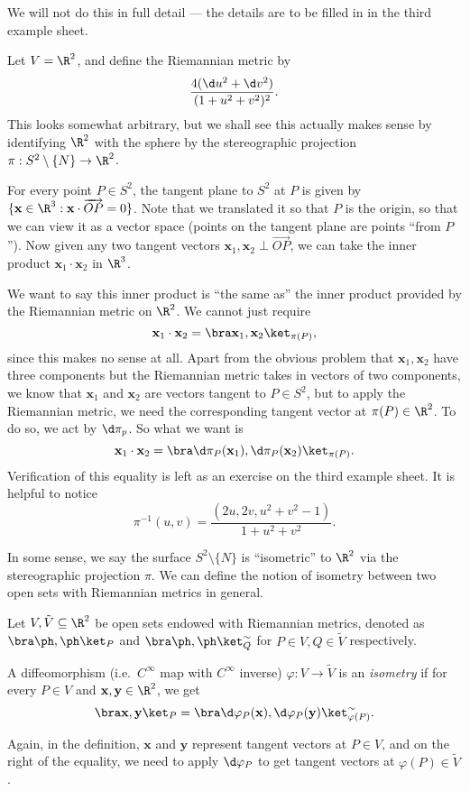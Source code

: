\documentclass[a4paper]{article}
\begin{document}
\begin{eg}
  We will not do this in full detail --- the details are to be filled in in the third example sheet.

  Let $V = \R^2$, and define the Riemannian metric by
  \[
    \frac{4(\d u^2 + \d v^2)}{(1 + u^2 + v^2)^2}.
  \]
  This looks somewhat arbitrary, but we shall see this actually makes sense by identifying $\R^2$ with the sphere by the stereographic projection $\pi: S^2 \setminus \{N\} \to \R^2$.

  For every point $P \in S^2$, the tangent plane to $S^2$ at $P$ is given by $\{\mathbf{x} \in \R^3: \mathbf{x}\cdot \overrightarrow{OP} = 0\}$. Note that we translated it so that $P$ is the origin, so that we can view it as a vector space (points on the tangent plane are points ``from $P$''). Now given any two tangent vectors $\mathbf{x}_1, \mathbf{x}_2 \perp \overrightarrow{OP}$, we can take the inner product $\mathbf{x}_1 \cdot \mathbf{x}_2$ in $\R^3$.

  We want to say this inner product is ``the same as'' the inner product provided by the Riemannian metric on $\R^2$. We cannot just require
  \[
    \mathbf{x}_1 \cdot \mathbf{x}_2 = \bra \mathbf{x}_1, \mathbf{x}_2 \ket_{\pi(P)},
  \]
  since this makes no sense at all. Apart from the obvious problem that $\mathbf{x}_1, \mathbf{x}_2$ have three components but the Riemannian metric takes in vectors of two components, we know that $\mathbf{x}_1$ and $\mathbf{x}_2$ are vectors tangent to $P \in S^2$, but to apply the Riemannian metric, we need the corresponding tangent vector at $\pi(P) \in \R^2$. To do so, we act by $\d \pi_p$. So what we want is
  \[
    \mathbf{x}_1 \cdot \mathbf{x}_2 = \bra \d \pi_P(\mathbf{x}_1), \d \pi_P(\mathbf{x}_2)\ket_{\pi(P)}.
  \]
  Verification of this equality is left as an exercise on the third example sheet. It is helpful to notice
  \[
    \pi^{-1}(u, v) = \frac{(2u, 2v, u^2 + v^2 - 1)}{1 + u^2 + v^2}.
  \]
\end{eg}

In some sense, we say the surface $S^2 \setminus \{N\}$ is ``isometric'' to $\R^2$ via the stereographic projection $\pi$. We can define the notion of isometry between two open sets with Riemannian metrics in general.

\begin{defi}[Isometry]
  Let $V, \tilde{V} \subseteq \R^2$ be open sets endowed with Riemannian metrics, denoted as $\bra \ph, \ph\ket_P$ and $\bra \ph, \ph\ket^\sim_Q$ for $P \in V, Q \in \tilde{V}$ respectively.

  A diffeomorphism (i.e.\ $C^\infty$ map with $C^\infty$ inverse) $\varphi: V \to \tilde{V}$ is an \emph{isometry} if for every $P \in V$ and $\mathbf{x}, \mathbf{y} \in \R^2$, we get
  \[
    \bra \mathbf{x}, \mathbf{y}\ket_P = \bra \d \varphi_P(\mathbf{x}), \d\varphi_P(\mathbf{y})\ket^\sim_{\varphi(P)}.
  \]
\end{defi}
Again, in the definition, $\mathbf{x}$ and $\mathbf{y}$ represent tangent vectors at $P \in V$, and on the right of the equality, we need to apply $\d \varphi_P$ to get tangent vectors at $\varphi(P) \in \tilde{V}$.
\end{document}
